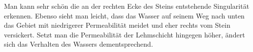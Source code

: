 \begin{figure}[H]
	\centering
	
\end{figure}
Man kann sehr schön die an der rechten Ecke des Steins entstehende Singularität erkennen. Ebenso sieht man leicht, dass das Wasser auf seinem Weg nach unten das Gebiet mit niedrigerer Permeabilität meidet und eher rechts vom Stein versickert. 
Setzt man die Permeabilität der Lehmschicht hingegen höher,
ändert sich das Verhalten des Wassers dementsprechend.
%	
%	

\newpage
